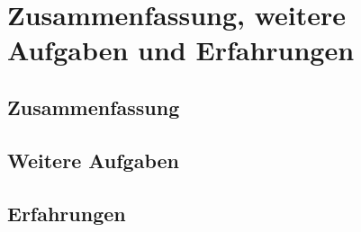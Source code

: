 \chapter{Zusammenfassung, weitere Aufgaben und Erfahrungen}
\label{cha:Zusammenfassung}

\section{Zusammenfassung}

\section{Weitere Aufgaben}

\section{Erfahrungen}

